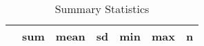 \begin{table}[htbp]\centering
\def\sym#1{\ifmmode^{#1}\else\(^{#1}\)\fi}
\caption{Summary Statistics \label{table1stata}}
\begin{tabular}{l*{1}{cccccc}}
\toprule
                    &         sum&        mean&          sd&         min&         max&           n\\
\midrule
\bottomrule
\end{tabular}
\end{table}
